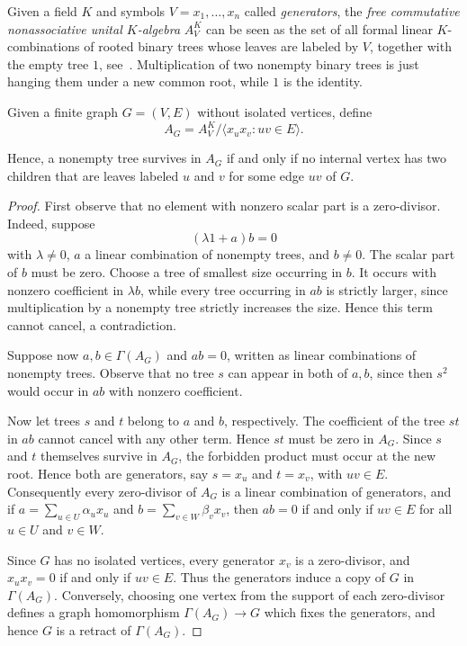 \documentclass[a4paper,11pt]{amsart}
\theoremstyle{definition}
\begin{document}
Given a field $K$ and symbols $V={x_1, \ldots, x_n}$ called \emph{generators}, the \emph{free commutative nonassociative unital $K$-algebra} $A^K_V$ can be seen as the set of all formal linear $K$-combinations of rooted binary trees whose leaves are labeled by $V$, together with the empty tree $1$, see~\cite{Petrogradsky05}. Multiplication of two nonempty binary trees is just hanging them under a new common root, while $1$ is the identity.

Given a finite graph $G=(V,E)$ without isolated vertices, define
\begin{equation}\label{eq:free-quotient}
A_G=A^K_V
\Big/\bigl\langle x_ux_v:uv\in E\bigr\rangle.
\end{equation}

Hence, a nonempty tree survives in $A_G$ if and only if no internal vertex has two children that are leaves labeled $u$ and
$v$ for some edge $uv$ of $G$.

\free*
\begin{proof}
First observe that no element with nonzero scalar part is a zero-divisor. Indeed, suppose
$$
(\lambda 1+a)b=0
$$
with $\lambda\neq0$, $a$ a linear combination of nonempty trees, and $b\neq0$. The scalar part of $b$ must be zero. Choose a tree of smallest size occurring in $b$. It occurs with nonzero coefficient in $\lambda b$, while every tree occurring in $ab$ is strictly larger, since multiplication by a nonempty tree strictly increases the size. Hence this term cannot cancel, a contradiction.

Suppose now $a,b\in \Gamma(A_G)$ and $ab=0$, written as linear combinations of nonempty trees. Observe that no tree $s$ can appear in both of $a,b$, since then $s^2$ would occur in $ab$ with nonzero coefficient.

Now let trees $s$ and $t$ belong to $a$ and $b$, respectively. The coefficient of the tree $st$ in $ab$ cannot cancel with any other term. Hence $st$ must be zero in $A_G$. Since $s$ and $t$ themselves survive in $A_G$, the forbidden product must occur at the new root. Hence both are generators, say $s=x_u$ and $t=x_v$, with $uv\in E$. Consequently every zero-divisor of $A_G$ is a linear combination of generators, and if $a=\sum_{u\in U}\alpha_u x_u$ and $b=\sum_{v\in W}\beta_v x_v$, then $ab=0$ if and only if $uv\in E$ for all $u\in U$ and $v\in W$.

Since $G$ has no isolated vertices, every generator $x_v$ is a zero-divisor, and $x_ux_v=0$ if and only if $uv\in E$. Thus the generators induce a copy of $G$ in $\Gamma(A_G)$. Conversely, choosing one vertex from the support of each zero-divisor defines a graph homomorphism $\Gamma(A_G)\to G$ which fixes the generators, and hence $G$ is a retract of $\Gamma(A_G)$.
\end{proof}
\end{document}
